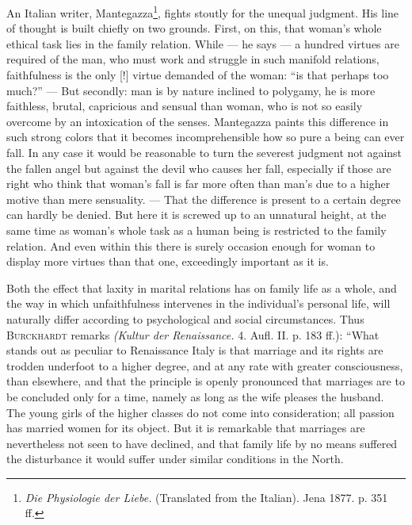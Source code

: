 \documentclass[12pt,a4paper,openany]{book}
\newcommand{\opage}[1]{\marginnote{\footnotesize\textit{[#1]}}}
\begin{document}
An Italian writer, Mantegazza\footnote[1]{\textit{Die Physiologie der Liebe.} (Translated from the Italian). Jena 1877.
p. 351 ff.}, fights stoutly for the unequal judgment. His line of thought is built chiefly on two grounds. First, on
this, that woman's whole ethical task lies in the family relation. While --- he says --- a hundred virtues are required
of the man, who must work and struggle in such manifold relations, faithfulness is the only [!] virtue demanded of the
woman: ``is that perhaps too much?'' --- But secondly: man is by nature inclined to polygamy, he is more faithless,
brutal, capricious and sensual than woman, who is not so easily overcome by an intoxication of the senses. Mantegazza
paints this difference in such strong colors that it becomes incomprehensible
\opage{296}how so pure a being can ever fall. In any case it would be reasonable to turn the severest judgment not
against the fallen angel but against the devil who causes her fall, especially if those are right who think that
woman's fall is far more often than man's due to a higher motive than mere sensuality. --- That the difference is present
to a certain degree can hardly be denied. But here it is screwed up to an unnatural height, at the same time as woman's
whole task as a human being is restricted to the family relation. And even within this there is surely occasion enough
for woman to display more virtues than that one, exceedingly important as it is.

Both the effect that laxity in marital relations has on family life as a whole, and the way in which unfaithfulness
intervenes in the individual's personal life, will naturally differ according to psychological and social
circumstances. Thus \textsc{Burckhardt} remarks \textit{(Kultur der Renaissance.} 4. Aufl. II. p. 183 ff.): ``What stands
out as peculiar to Renaissance Italy is that marriage and its rights are trodden underfoot to a higher degree, and at
any rate with greater consciousness, than elsewhere, and that the principle is openly pronounced that marriages are to
be concluded only for a time, namely as long as the wife pleases the husband. The young girls of the higher classes do
not come into consideration; all passion has married women for its object. But it is remarkable that marriages are
nevertheless not seen to have declined, and that family life by no means suffered the disturbance it would suffer under
similar conditions in the North.
\end{document}
